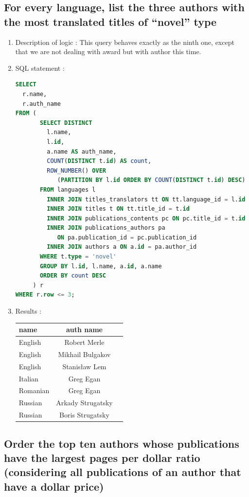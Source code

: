 \documentclass[doubleside, titlepage]{article}
\begin{document}
\subsection{For every language, list the three authors with the most translated titles of “novel” type}

	\begin{enumerate}
	\item Description of logic : This query behaves exactly as the ninth one, except that we are not dealing with award but with author this time.
	\item SQL statement :
		\begin{lstlisting}[language=SQL,showspaces=false,basicstyle=\ttfamily,numberstyle=\tiny,commentstyle=\color{gray}]
SELECT
  r.name,
  r.auth_name
FROM (
       SELECT DISTINCT
         l.name,
         l.id,
         a.name AS auth_name,
         COUNT(DISTINCT t.id) AS count,
         ROW_NUMBER() OVER
         	(PARTITION BY l.id ORDER BY COUNT(DISTINCT t.id) DESC) as row
       FROM languages l
         INNER JOIN titles_translators tt ON tt.language_id = l.id
         INNER JOIN titles t ON tt.title_id = t.id
         INNER JOIN publications_contents pc ON pc.title_id = t.id
         INNER JOIN publications_authors pa
         	ON pa.publication_id = pc.publication_id
         INNER JOIN authors a ON a.id = pa.author_id
       WHERE t.type = 'novel'
       GROUP BY l.id, l.name, a.id, a.name
       ORDER BY count DESC
     ) r
WHERE r.row <= 3;
		\end{lstlisting}

	\item Results :\\

	\begin{tabular}{|l|c|r|}
	  \hline
		name & auth name\\
	  \hline
English	& Robert Merle\\
English	& Mikhail Bulgakov\\
English	& Stanisław Lem\\
Italian	& Greg Egan\\
Romanian & Greg Egan\\
Russian	& Arkady Strugatsky\\
Russian	& Boris Strugatsky\\
	  \hline
	\end{tabular}
\end{enumerate}

\newpage

\subsection{Order the top ten authors whose publications have the largest pages per dollar ratio (considering all publications of an author that have a dollar price)}
\end{document}
